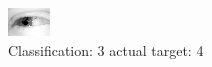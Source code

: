 \begin{figure}[h!]
\begin{center}
\includegraphics[width=0.60\columnwidth]{figures/ID2520_class_3_target_4.png}
\end{center}
\caption{ Classification: 3 actual target: 4}
\label{fig:ID2520_class_3_target_4}
\end{figure}
